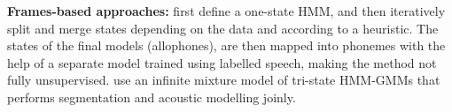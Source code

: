 
\textbf{Frames-based approaches:} %
\textcite{varadarajan2008unsupervised} first define a one-state HMM, and then iteratively split and merge states depending on the data and according to a heuristic.
The states of the final models (allophones), are then mapped into phonemes with the help of a separate model trained using labelled speech, making the method not fully unsupervised.
\textcite{lee2012nonparametric} use an infinite mixture model of tri-state HMM-GMMs that performs segmentation and acoustic modelling joinly.
